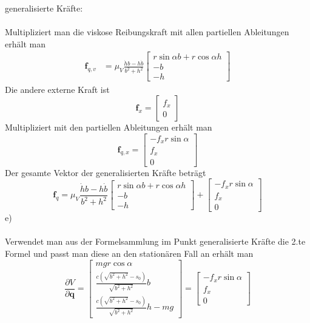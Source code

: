 \noindent
generalisierte Kräfte:\\ \\
Multipliziert man die viskose Reibungskraft mit allen partiellen Ableitungen erhält man
\begin{align*}
	\textbf{f}_{q,v} &= \mu_V \frac{\dot{h}b - h\dot{b}}{b^2 + h^2} \left[ \begin{matrix}
		r\sin\alpha b + r\cos\alpha h \\
		-b \\
		-h
	\end{matrix}\right]
\end{align*}
Die andere externe Kraft ist
\[
	\textbf{f}_x = \left[ \begin{matrix}
		f_x \\
		0
	\end{matrix}\right]
\]
Multipliziert mit den partiellen Ableitungen erhält man
\[
	\textbf{f}_{q,x} = \left[ \begin{matrix}
		-f_x r \sin\alpha \\
		f_x \\
		0
	\end{matrix}\right]
\]
Der gesamte Vektor der generalisierten Kräfte beträgt
\[
	\textbf{f}_q = \mu_V \frac{\dot{h}b - h\dot{b}}{b^2 + h^2} \left[ \begin{matrix}
	r\sin\alpha b + r\cos\alpha h \\
	-b \\
	-h
	\end{matrix}\right] 
	+ 
	\left[ \begin{matrix}
	-f_x r \sin\alpha \\
	f_x \\
	0
	\end{matrix}\right]
\]
e) \\ \\
Verwendet man aus der Formelsammlung im Punkt generalisierte Kräfte die 2.te Formel und passt man diese an den stationären Fall an erhält man
\[
	\frac{\partial V}{\partial \textbf{q}} = \left[ \begin{matrix}
		mgr\cos\alpha\\
		\frac{c\left( \sqrt{b^2 + h^2} - s_0\right)}{\sqrt{b^2 + h^2}} b \\
		\frac{c\left( \sqrt{b^2 + h^2} - s_0\right)}{\sqrt{b^2 + h^2}} h - mg
	\end{matrix}\right]
	=
	\left[ \begin{matrix}
	-f_x r \sin\alpha \\
	f_x \\
	0
	\end{matrix}\right]
\]
